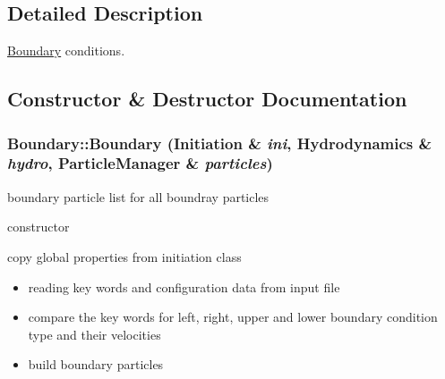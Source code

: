 \subsection{Detailed Description}
\hyperlink{classBoundary}{Boundary} conditions. 

\subsection{Constructor \& Destructor Documentation}
\hypertarget{classBoundary_8fe88473063d74e67a5932f2e4d2e517}{
\subsubsection[{Boundary}]{\setlength{\rightskip}{0pt plus 5cm}Boundary::Boundary ({\bf Initiation} \& {\em ini}, \/  {\bf Hydrodynamics} \& {\em hydro}, \/  {\bf ParticleManager} \& {\em particles})}}
\label{classBoundary_8fe88473063d74e67a5932f2e4d2e517}


boundary particle list for all boundray particles 

constructor 

copy global properties from initiation class

\begin{itemize}
\item reading key words and configuration data from input file\end{itemize}


\begin{itemize}
\item compare the key words for left, right, upper and lower boundary condition type and their velocities\end{itemize}


\begin{itemize}
\item build boundary particles \end{itemize}


